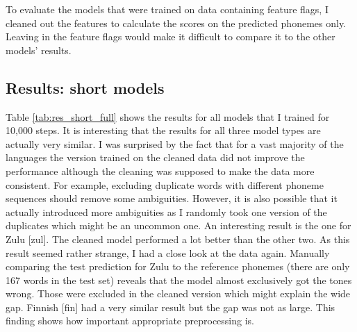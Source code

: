 To evaluate the models that were trained on data containing feature flags, I cleaned out the features to calculate the scores on the predicted phonemes only. Leaving in the feature flags would make it difficult to compare it to the other models' results.

\subsection{Results: short models}
Table \ref{tab:res_short_full} shows the results for all models that I trained for 10,000 steps. It is interesting that the results for all three model types are actually very similar. I was surprised by the fact that for a vast majority of the languages the version trained on the cleaned data did not improve the performance although the cleaning was supposed to make the data more consistent. For example, excluding duplicate words with different phoneme sequences should remove some ambiguities. However, it is also possible that it actually introduced more ambiguities as I randomly took one version of the duplicates which might be an uncommon one. An interesting result is the one for Zulu [zul]. The cleaned model performed a lot better than the other two. As this result seemed rather strange, I had a close look at the data again. Manually comparing the test prediction for Zulu to the reference phonemes (there are only 167 words in the test set) reveals that the model almost exclusively got the tones wrong. Those were excluded in the cleaned version which might explain the wide gap. Finnish [fin] had a very similar result but the gap was not as large. This finding shows how important appropriate preprocessing is.

